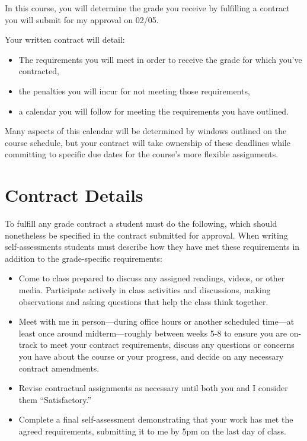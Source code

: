 \documentclass[
]{book}
\begin{document}
In this course, you will determine the grade you receive by fulfilling a contract you will submit for my approval on 02/05.

Your written contract will detail:

\begin{itemize}
\item
  The requirements you will meet in order to receive the grade for which you've contracted,
\item
  the penalties you will incur for not meeting those requirements,
\item
  a calendar you will follow for meeting the requirements you have outlined.
\end{itemize}

Many aspects of this calendar will be determined by windows outlined on the course schedule, but your contract will take ownership of these deadlines while committing to specific due dates for the course's more flexible assignments.

\hypertarget{contract-details}{%
\section{Contract Details}\label{contract-details}}

To fulfill any grade contract a student must do the following, which should nonetheless be specified in the contract submitted for approval. When writing self-assessments students must describe how they have met these requirements in addition to the grade-specific requirements:

\begin{itemize}
\item
  Come to class prepared to discuss any assigned readings, videos, or other media. Participate actively in class activities and discussions, making observations and asking questions that help the class think together.
\item
  Meet with me in person---during office hours or another scheduled time---at least once around midterm---roughly between weeks 5-8 to ensure you are on-track to meet your contract requirements, discuss any questions or concerns you have about the course or your progress, and decide on any necessary contract amendments.
\item
  Revise contractual assignments as necessary until both you and I consider them ``Satisfactory.''
\item
  Complete a final self-assessment demonstrating that your work has met the agreed requirements, submitting it to me by 5pm on the last day of class.
\end{itemize}
\end{document}
